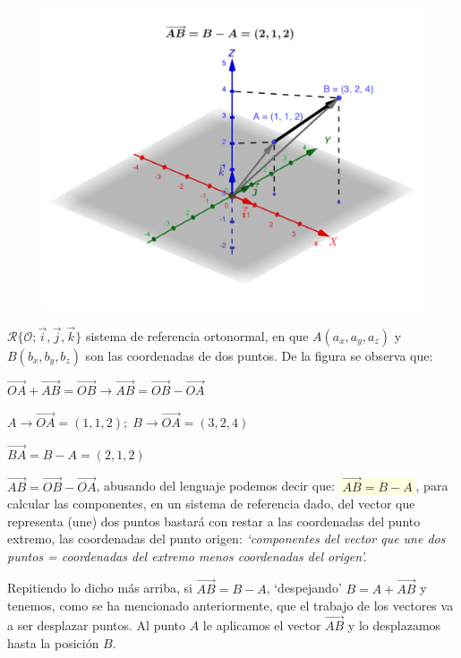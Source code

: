 \begin{multicols}{2}

	\begin{figure}[H]
	\centering
	\includegraphics[width=.55\textwidth]{imagenes/imagenes09/T09IM09.png}
	\end{figure}
	
	$\mathcal R\{\mathcal O; \vec i, \vec j, \vec k\}$ sistema de referencia ortonormal, en que $A(a_x,a_y,a_z)$ y $B(b_x,b_y,b_z)$
son las coordenadas de dos puntos. De la figura se observa que:

\noindent $\overrightarrow{OA}+\overrightarrow{AB}=\overrightarrow{OB} \to \overrightarrow{AB}=\overrightarrow{OB}-\overrightarrow{OA}$

\noindent \footnotesize{$A\to \overrightarrow{OA}=(1,1,2); \; B\to \overrightarrow{OA}=(3,2,4)$}

\noindent \normalsize{$\overrightarrow{BA}=B-A=(2,1,2)$}

\end{multicols}



\noindent \small{$\overrightarrow{AB}=\overrightarrow{OB}-\overrightarrow{OA}$}\normalsize{,} abusando del lenguaje podemos decir que: \colorbox{LightYellow}{$\boxed{\; \overrightarrow{AB}=B-A\;}$}, para calcular las componentes, en un sistema de referencia dado, del  vector que representa (une) dos puntos bastará con restar a las coordenadas del punto extremo, las coordenadas del punto origen: \textit{`componentes del vector que une dos puntos = coordenadas del extremo menos coordenadas del origen'.}

Repitiendo lo dicho más arriba, si $\overrightarrow{AB}=B-A$, `despejando' $B=A+\overrightarrow{AB}$  y tenemos, como se ha mencionado anteriormente, que el trabajo de los vectores va a ser desplazar puntos. Al punto $A$ le aplicamos el vector $\overrightarrow{AB}$ y lo desplazamos hasta la posición $B$.

